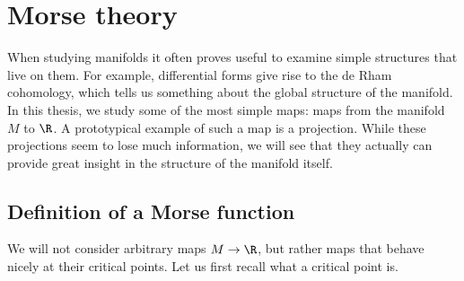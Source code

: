 \chapter{Morse theory}
\label{chap:morse-theory}

\vspace*{-0.8cm}
When studying manifolds it often proves useful to examine simple structures that live on them. For example, differential forms give rise to the de Rham cohomology, which tells us something about the global structure of the manifold. In this thesis, we study some of the most simple maps: maps from the manifold $M$ to $\R$. A prototypical example of such a map is a projection.
While these projections seem to lose much information, we will see that they actually can provide great insight in the structure of the manifold itself.

\section{Definition of a Morse function}

We will not consider arbitrary maps $M \to \R$, but rather maps that behave nicely at their critical points. Let us first recall what a critical point is.

